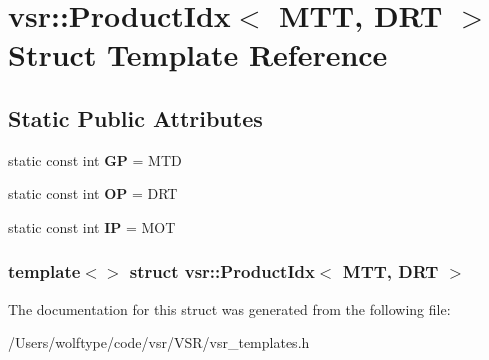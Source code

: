 \hypertarget{structvsr_1_1_product_idx_3_01_m_t_t_00_01_d_r_t_01_4}{\section{vsr\-:\-:Product\-Idx$<$ M\-T\-T, D\-R\-T $>$ Struct Template Reference}
\label{structvsr_1_1_product_idx_3_01_m_t_t_00_01_d_r_t_01_4}
}
\subsection*{Static Public Attributes}
\begin{DoxyCompactItemize}
\item 
\hypertarget{structvsr_1_1_product_idx_3_01_m_t_t_00_01_d_r_t_01_4_a8056554e0d33f71e529acf1ab3214604}{static const int {\bfseries G\-P} = M\-T\-D}\label{structvsr_1_1_product_idx_3_01_m_t_t_00_01_d_r_t_01_4_a8056554e0d33f71e529acf1ab3214604}

\item 
\hypertarget{structvsr_1_1_product_idx_3_01_m_t_t_00_01_d_r_t_01_4_a68d019956406ae30f1bf64778818e7bb}{static const int {\bfseries O\-P} = D\-R\-T}\label{structvsr_1_1_product_idx_3_01_m_t_t_00_01_d_r_t_01_4_a68d019956406ae30f1bf64778818e7bb}

\item 
\hypertarget{structvsr_1_1_product_idx_3_01_m_t_t_00_01_d_r_t_01_4_a67233710b803e58f82655b5a3db5aae2}{static const int {\bfseries I\-P} = M\-O\-T}\label{structvsr_1_1_product_idx_3_01_m_t_t_00_01_d_r_t_01_4_a67233710b803e58f82655b5a3db5aae2}

\end{DoxyCompactItemize}
\subsubsection*{template$<$$>$ struct vsr\-::\-Product\-Idx$<$ M\-T\-T, D\-R\-T $>$}



The documentation for this struct was generated from the following file\-:\begin{DoxyCompactItemize}
\item 
/\-Users/wolftype/code/vsr/\-V\-S\-R/vsr\-\_\-templates.\-h\end{DoxyCompactItemize}
